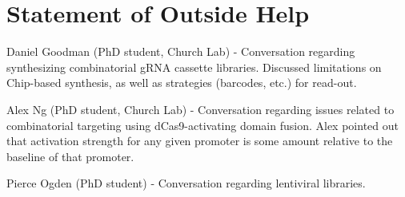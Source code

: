 \documentclass[10pt]{article}
\begin{document}


\pagebreak




\section*{Statement of Outside Help}

\noindent Daniel Goodman (PhD student, Church Lab) - Conversation regarding synthesizing combinatorial gRNA cassette libraries. Discussed limitations on Chip-based synthesis, as well as strategies (barcodes, etc.) for read-out.
\newline

\noindent Alex Ng (PhD student, Church Lab) - Conversation regarding issues related to combinatorial targeting using dCas9-activating domain fusion. Alex pointed out that activation strength for any given promoter is some amount relative to the baseline of that promoter.
\newline

\noindent Pierce Ogden (PhD student) - Conversation regarding lentiviral libraries.
\end{document}
